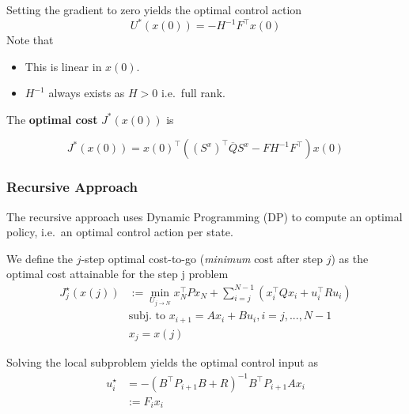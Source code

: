 \newpar{}

Setting the gradient to zero yields the optimal control action
\noindent\begin{equation*}
    U^*(x(0)) = -H^{-1}F^\top x(0)
\end{equation*}
Note that
\begin{itemize}
    \item This is linear in $x(0)$.
    \item $H^{-1}$ always exists as $H>0$ i.e.\ full rank.
\end{itemize}

\newpar{}
The \textbf{optimal cost} $J^*(x(0))$ is

\noindent\begin{equation*}
    J^*(x(0)) = {x(0)}^{\top}\left({(S^{x})}^{\top}\overline{Q}S^{x}- F H^{-1} F^\top\right)x(0)
\end{equation*}

\subsubsection{Recursive Approach}
The recursive approach uses Dynamic Programming (DP) to compute an optimal policy, i.e.\ an optimal control action per state.

\newpar{}

We define the $j$-step optimal cost-to-go (\textit{minimum} cost after step $j$) as the optimal cost attainable for the step j problem
\noindent\begin{align*}
    J_j^\star(x(j)) & :=\min_{U_{j\to N}}x_N^\top Px_N+\sum_{i=j}^{N-1}(x_i^\top Qx_i+u_i^\top Ru_i) \\
                    & \text{subj.\ to }x_{i+1}=Ax_i+Bu_i,i=j,...,N-1                                 \\
                    & x_j=x(j)
\end{align*}

\newpar{}

Solving the local subproblem yields the optimal control input as
\noindent\begin{equation*}
    \begin{aligned}
        u_{i}^{\star} & =-{(B^\top P_{i+1} B+R)}^{-1}B^\top P_{i+1} Ax_{i} \\
                      & :=F_{i}x_{i}
    \end{aligned}
\end{equation*}

